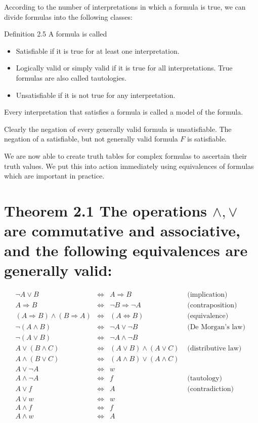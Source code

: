 \documentclass[10pt]{article}
\begin{document}
According to the number of interpretations in which a formula is true, we can divide formulas into the following classes:

Definition 2.5 A formula is called

\begin{itemize}
  \item Satisfiable if it is true for at least one interpretation.
  \item Logically valid or simply valid if it is true for all interpretations. True formulas are also called tautologies.
  \item Unsatisfiable if it is not true for any interpretation.
\end{itemize}

Every interpretation that satisfies a formula is called a model of the formula.

Clearly the negation of every generally valid formula is unsatisfiable. The negation of a satisfiable, but not generally valid formula $F$ is satisfiable.

We are now able to create truth tables for complex formulas to ascertain their truth values. We put this into action immediately using equivalences of formulas which are important in practice.

\section*{Theorem 2.1 The operations $\wedge, \vee$ are commutative and associative, and the following equivalences are generally valid:}
$$
\begin{aligned}
\neg A \vee B & \Leftrightarrow & A \Rightarrow B & \text { (implication) } \\
A \Rightarrow B & \Leftrightarrow & \neg B \Rightarrow \neg A & \text { (contraposition) } \\
(A \Rightarrow B) \wedge(B \Rightarrow A) & \Leftrightarrow & (A \Leftrightarrow B) & \text { (equivalence) } \\
\neg(A \wedge B) & \Leftrightarrow & \neg A \vee \neg B & \text { (De Morgan's law) } \\
\neg(A \vee B) & \Leftrightarrow & \neg A \wedge \neg B & \\
A \vee(B \wedge C) & \Leftrightarrow & (A \vee B) \wedge(A \vee C) & \text { (distributive law) } \\
A \wedge(B \vee C) & \Leftrightarrow & (A \wedge B) \vee(A \wedge C) & \\
A \vee \neg A & \Leftrightarrow & w & \\
A \wedge \neg A & \Leftrightarrow & f & \text { (tautology) } \\
A \vee f & \Leftrightarrow & A & \text { (contradiction) } \\
A \vee w & \Leftrightarrow & w & \\
A \wedge f & \Leftrightarrow & f & \\
A \wedge w & \Leftrightarrow & A &
\end{aligned}
$$
\end{document}
